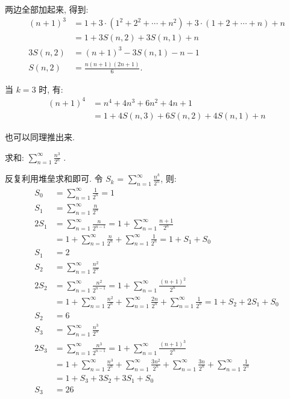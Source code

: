 两边全部加起来, 得到: 
\begin{align*} 
(n+1)^3 &= 1 + 3\cdot(1^2+2^2+\cdots+n^2) + 3\cdot(1+2+\cdots+n) + n \\
	&= 1 + 3S(n,2) + 3S(n,1) + n\\
3S(n,2) &= (n+1)^3 - 3S(n,1) - n - 1 \\
	S(n,2) &= \frac{n(n+1)(2n+1)}{6} .
\end{align*}

当 $ k = 3 $ 时, 有:
\begin{align*} 
(n+1)^4 &= n^4 + 4n^3 + 6n^2 + 4n + 1 \\
		&= 1 + 4S(n,3) + 6S(n,2) + 4S(n,1) + n
\end{align*} 

也可以同理推出来.

\newpage
求和: 
$\displaystyle \sum_{n=1}^{\infty}{\frac{n^3}{2^n}}$ .

\noindent 反复利用堆垒求和即可. 令 $S_k$ = $\displaystyle \sum_{n=1}^{\infty}{\frac{n^k}{2^n}}$, 则:
\begin{align*}
S_0 &= \sum_{n=1}^{\infty}{\frac{1}{2^n}} = 1 \\
S_1 &= \sum_{n=1}^{\infty}{\frac{n}{2^n}} \\
2S_1 &= \sum_{n=1}^{\infty}{\frac{n}{2^{n-1}}} = 1+\sum_{n=1}^{\infty}{\frac{n+1}{2^{n}}} \\
&= 1+\sum_{n=1}^{\infty}{\frac{n}{2^{n}}} + \sum_{n=1}^{\infty}{\frac{1}{2^{n}}} = 1 + S_1 + S_0\\
S_1 &= 2 \\
S_2 &= \sum_{n=1}^{\infty}{\frac{n^2}{2^n}} \\
2S_2 &= \sum_{n=1}^{\infty}{\frac{n^2}{2^{n-1}}} = 1 + \sum_{n=1}^{\infty}{\frac{(n+1)^2}{2^n}}\\ 
&= 1 + \sum_{n=1}^{\infty}{\frac{n^2}{2^n}} + \sum_{n=1}^{\infty}{\frac{2n}{2^n}} + \sum_{n=1}^{\infty}{\frac{1}{2^n}} = 1 + S_2 + 2S_1 + S_0 \\
S_2 &= 6 \\
S_3 &= \sum_{n=1}^{\infty}{\frac{n^3}{2^n}} \\
2S_3 &=   \sum_{n=1}^{\infty}{\frac{n^3}{2^{n-1}}} = 1 + \sum_{n=1}^{\infty}{\frac{(n+1)^3}{2^n}} \\
&= 1 +  \sum_{n=1}^{\infty}{\frac{n^3}{2^n}} +  \sum_{n=1}^{\infty}{\frac{3n^2}{2^n}} +  \sum_{n=1}^{\infty}{\frac{3n}{2^n}} +  \sum_{n=1}^{\infty}{\frac{1}{2^n}} \\
&= 1 + S_3 + 3S_2 + 3S_1 + S_0\\
S_3 &= 26
\end{align*}

